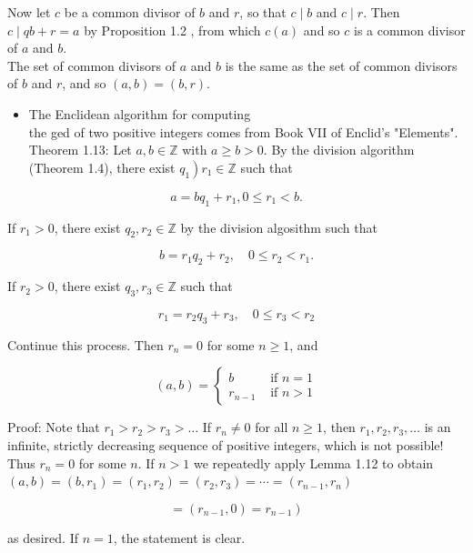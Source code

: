 \documentclass[10pt]{article}
\begin{document}
Now let $c$ be a common divisor of $b$ and $r$, so that $c \mid b$ and $c \mid r$. Then $c \mid q b+r=a$ by Proposition 1.2 , from which $c(a)$ and so $c$ is a common divisor of $a$ and $b$.\\
The set of common divisors of $a$ and $b$ is the same as the set of common divisors of $b$ and $r$, and so $(a, b)=(b, r)$.

\begin{itemize}
  \item The Enclidean algorithm for computing\\
the ged of two positive integers comes from Book VII of Enclid's "Elements".\\
Theorem 1.13: Let $a, b \in \mathbb{Z}$ with $a \geqslant b>0$. By the division algorithm (Theorem 1.4), there exist $\left.q_{1}\right) r_{1} \in \mathbb{Z}$ such that
\end{itemize}

$$
a=b q_{1}+r_{1}, 0 \leqslant r_{1}<b .
$$

If $r_{1}>0$, there exist $q_{2}, r_{2} \in \mathbb{Z}$ by the division algosithm such that

$$
b=r_{1} q_{2}+r_{2}, \quad 0 \leqslant r_{2}<r_{1} .
$$

If $r_{2}>0$, there exist $q_{3}, r_{3} \in \mathbb{Z}$ such that

$$
r_{1}=r_{2} q_{3}+r_{3}, \quad 0 \leq r_{3}<r_{2}
$$

Continue this process. Then $r_{n}=0$ for some $n \geqslant 1$, and

$$
(a, b)= \begin{cases}b & \text { if } n=1 \\ r_{n-1} & \text { if } n>1\end{cases}
$$

Proof: Note that $r_{1}>r_{2}>r_{3}>\ldots$ If $r_{n} \neq 0$ for all $n \geqslant 1$, then $r_{1}, r_{2}, r_{3}, \ldots$ is an\\
infinite, strictly decreasing sequence of positive integers, which is not possible!\\
Thus $r_{n}=0$ for some $n$. If $n>1$ we repeatedly apply Lemma 1.12 to obtain\\
$(a, b)=\left(b, r_{1}\right)=\left(r_{1}, r_{2}\right)=\left(r_{2}, r_{3}\right)=\cdots=\left(r_{n-1}, r_{n}\right)$

$$
\left.=\left(r_{n-1}, 0\right)=r_{n-1}\right)
$$

as desired. If $n=1$, the statement is clear.
\end{document}
